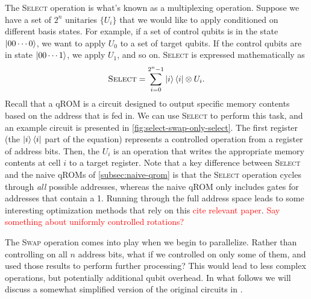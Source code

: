 \documentclass[a4paper,12pt]{article}
\newcommand\todo[1]{\textcolor{red}{#1}}
\begin{document}
The \textsc{Select} operation is what's known as a multiplexing operation.
Suppose we have a set of $2^n$ unitaries $\{U_i\}$ that we would like to apply conditioned on different basis states.
For example, if a set of control qubits is in the state $\ket{00\cdots0}$, we want to apply $U_0$ to a set of target qubits.
If the control qubits are in state $\ket{00\cdots1}$, we apply $U_1$, and so on.
\textsc{Select} is expressed mathematically as 
\begin{equation}
 \textsc{Select} = \sum_{i=0}^{2^n - 1} \ket{i}\bra{i} \otimes U_i.
\end{equation}
Recall that a qROM is a circuit designed to output specific memory contents based on the address that is fed in.
We can use \textsc{Select} to perform this task, and an example circuit is presented in \autoref{fig:select-swap-only-select}.
The first register (the $\ket{i} \bra{i}$ part of the equation) represents a controlled operation from a register of address bits.
Then, the $U_i$ is an operation that writes the appropriate memory contents at cell $i$ to a target register. 
Note that a key difference between \textsc{Select} and the naive qROMs of \autoref{subsec:naive-qrom} is that the \textsc{Select} operation cycles through \emph{all} possible addresses, whereas the naive qROM only includes gates for addresses that contain a 1.
Running through the full address space leads to some interesting optimization methods that rely on this \todo{cite relevant paper}.
\todo{Say something about uniformly controlled rotations?}

The \textsc{Swap} operation comes into play when we begin to parallelize.
Rather than controlling on all $n$ address bits, what if we controlled on only some of them, and used those results to perform further processing?
This would lead to less complex operations, but potentially additional qubit overhead.
In what follows we will discuss a somewhat simplified version of the original circuits in \cite{Vadym2018}.
\end{document}
